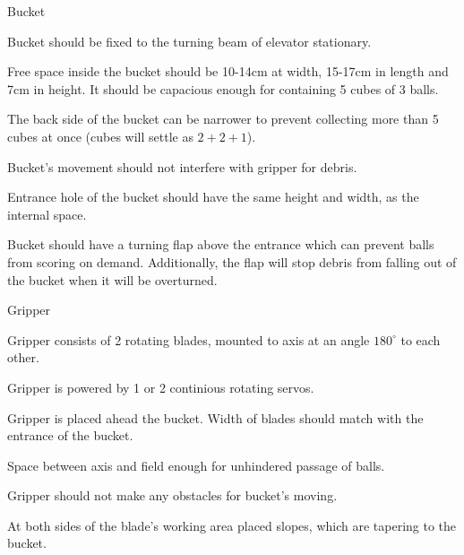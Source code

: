 \begin{enumerate*}
  	\item Bucket
  	\begin{enumerate*}
  		\item Bucket should be fixed to the turning beam of elevator stationary.
  		
  		\item Free space inside the bucket should be 10-14cm at width, 15-17cm in length and 7cm in height. It should be capacious enough for containing 5 cubes of 3 balls.
  		
  		\item The back side of the bucket can be narrower to prevent collecting more than 5 cubes at once (cubes will settle as $2+2+1$). 
  		
  		\item Bucket's movement should not interfere with gripper for debris.
  		
  		
  		\item Entrance hole of the bucket should have the same height and width, as the internal space.
  		
  		\item Bucket should have a turning flap above the entrance which can prevent balls from scoring on demand. Additionally, the flap will stop debris from falling out of the bucket when it will be overturned.
  	\end{enumerate*}
  	
  	\item Gripper
  	\begin{enumerate*}
  		\item Gripper consists of 2 rotating blades, mounted to axis at an angle $180^{\circ}$ to each other.
  		
  		\item Gripper is powered by 1 or 2 continious rotating servos.
  		
  		\item Gripper is placed ahead the bucket. Width of blades should match with the entrance of the bucket.
  		
  		\item Space between axis and field enough for unhindered passage of balls.
  		
  		\item Gripper should not make any obstacles for bucket's moving.
  		
  		\item At both sides of the blade's working area placed slopes, which are tapering to the bucket.
  	\end{enumerate*}
  	

\end{enumerate*}
